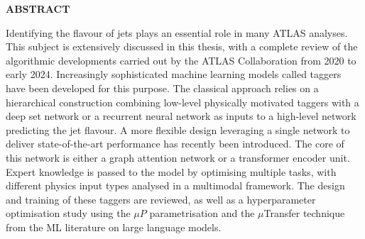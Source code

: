 \vspace*{\fill}
\begin{center}
\textbf{\large \color{oxfordblue} ABSTRACT}
\end{center}
Identifying the flavour of jets plays an essential role in many ATLAS analyses. This subject is extensively discussed in this thesis, with a complete review of the algorithmic developments carried out by the ATLAS Collaboration from 2020 to early 2024. Increasingly sophisticated machine learning models called taggers have been developed for this purpose. The classical approach relies on a hierarchical construction combining low-level physically motivated taggers with a deep set network or a recurrent neural network as inputs to a high-level network predicting the jet flavour. A more flexible design leveraging a single network to deliver state-of-the-art performance has recently been introduced. The core of this network is either a graph attention network or a transformer encoder unit. Expert knowledge is passed to the model by optimising multiple tasks, with different physics input types analysed in a multimodal framework. The design and training of these taggers are reviewed, as well as a hyperparameter optimisation study using the $\mu P$ parametrisation and the $\mu$Transfer technique from the ML literature on large language models. \\

